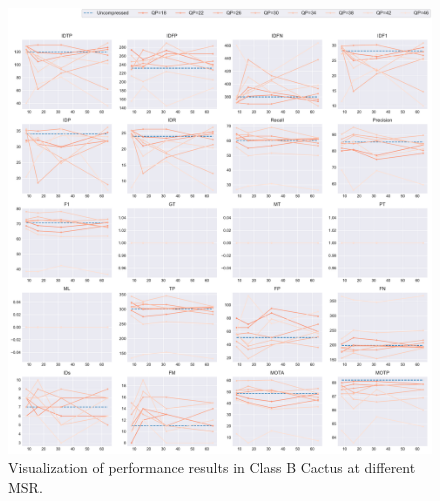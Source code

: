 \begin{figure}[!htbp]
\centering
\includegraphics[width=1.0\linewidth]{img/appendix/Cactus_all_multiplots_msr.pdf}
\caption[Visualization of performance results in Class B Cactus at different MSR]
{Visualization of performance results in Class B Cactus at different MSR.}
\label{fig:Cactus_all_msr}
\end{figure}



